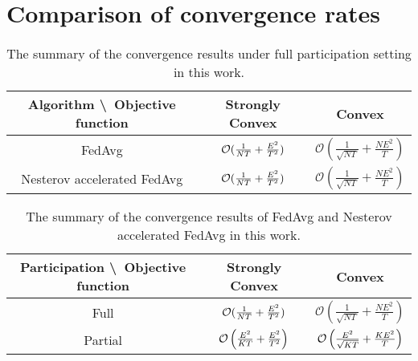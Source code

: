 

\section{Comparison of convergence rates}

\begin{table}
\centering
\begin{tabular}{|c|c|c|}\hline 
	Algorithm \textbackslash\  Objective function        & Strongly Convex        & Convex \\ \hline \hline
	FedAvg                         & ${\mathcal{O}}(\frac{1}{NT}+\frac{E^{2}}{T^{2}})$    &  $\mathcal{O}\left(\frac{1}{\sqrt{NT}}+\frac{NE^{2}}{T}\right)$       \\ \hline
	Nesterov accelerated FedAvg    & ${\mathcal{O}}(\frac{1}{NT}+\frac{E^{2}}{T^{2}})$    & $\mathcal{O}\left(\frac{1}{\sqrt{NT}}+\frac{NE^{2}}{T}\right)$       \\ \hline
\end{tabular}
\caption{The summary of the convergence results under full participation setting in this work.}
\end{table}

\begin{table}
\centering
\begin{tabular}{|c|c|c|}\hline 
	Participation \textbackslash\ Objective function            & Strongly Convex        & Convex \\ \hline \hline
	Full                         & ${\mathcal{O}}(\frac{1}{NT}+\frac{E^{2}}{T^{2}})$    &  $\mathcal{O}\left(\frac{1}{\sqrt{NT}}+\frac{NE^{2}}{T}\right)$       \\ \hline
	Partial                      &  ${\mathcal{O}}\left(\frac{E^{2}}{KT}+\frac{E^{2}}{T^{2}}\right)$   &  ${\mathcal{O}}\left(\frac{E^2}{\sqrt{KT}}+\frac{KE^2}{T} \right)$      \\ \hline
\end{tabular}
\caption{The summary of the convergence results of FedAvg and Nesterov accelerated FedAvg in this work.}
\end{table}



